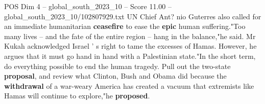 \begin{textsample}{POS Dim 4 – global\_south\_2023\_10 – Score 11.00 – global\_south\_2023\_10/102807929.txt}
UN Chief Ant? nio Guterres also called for an immediate humanitarian \textbf{ceasefire} to ease the \textbf{epic} human suffering."Too many lives -- and the fate of the entire region -- hang in the balance,"he said.
Mr Kukah acknowledged Israel ' s right to tame the excesses of Hamas.
However, he argues that it must go hand in hand with a Palestinian state."In the short term, do everything possible to end the human tragedy.
Pull out the two-state \textbf{proposal}, and review what Clinton, Bush and Obama did because the \textbf{withdrawal} of a war-weary America has created a vacuum that extremists like Hamas will continue to explore,"he \textbf{proposed}.

\end{textsample}

